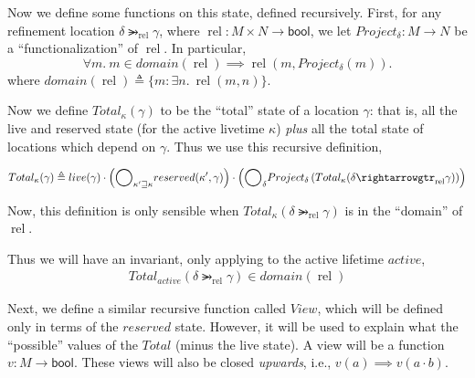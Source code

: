 \documentclass{article}
\newcommand{\bool}{\textsf{bool}}
\DeclareMathOperator{\rel}{rel}
\renewcommand{\eqdef}{\triangleq}
\newcommand{\refines}{\rightarrowgtr}
\newcommand{\ltGe}{\sqsupseteq}
\newcommand\Bigcircle{\raisebox{-0.5mm}{\scalebox{1.7}{$\bigcirc$}}}
\begin{document}
Now we define some functions on this state, defined recursively.
First, for any refinement location $\delta \refines_{\rel} \gamma$,
where $\rel : M \times N \to \bool$,
we let $Project_\delta : M \to N$ be a ``functionalization'' of $\rel$. In particular,
\[
  \forall m .~ m \in domain(\rel) \implies \rel(m, Project_\delta(m)).
\]
where $domain(\rel) \eqdef \{m : \exists n .~ \rel(m, n)\}$.

Now we define $Total_\kappa(\gamma)$ to be the ``total'' state of a location $\gamma$:
that is, all the live and reserved state (for the active livetime $\kappa$)
\emph{plus} all the total state of locations which depend on $\gamma$. Thus we use
this recursive definition,

\[
  Total_\kappa(\gamma) \eqdef live(\gamma) \cdot
      \left(
        \Bigcircle_{\kappa' \ltGe \kappa} reserved(\kappa',\gamma)
      \right) \cdot
      \left(
        \Bigcircle_{\delta} Project_\delta\left(Total_\kappa(\delta \refines_{\rel} \gamma)\right)
      \right)
\]

Now, this definition is only sensible when 
$Total_\kappa(\delta \refines_{\rel} \gamma)$ is in the ``domain'' of $\rel$.

Thus we will have an invariant, only applying to the active lifetime $active$,
\begin{align}
  Total_{active}(\delta \refines_{\rel} \gamma) \in domain(\rel) \label{invTotal}
\end{align}

Next, we define a similar recursive function called $View$, which will be defined
only in terms of the $reserved$ state. However, it will be used to explain what the ``possible''
values of the $Total$ (minus the live state). A view will be a function $v : M \to \bool$.
These views will also be closed \emph{upwards}, i.e., $v(a) \implies v(a \cdot b)$.
\end{document}
